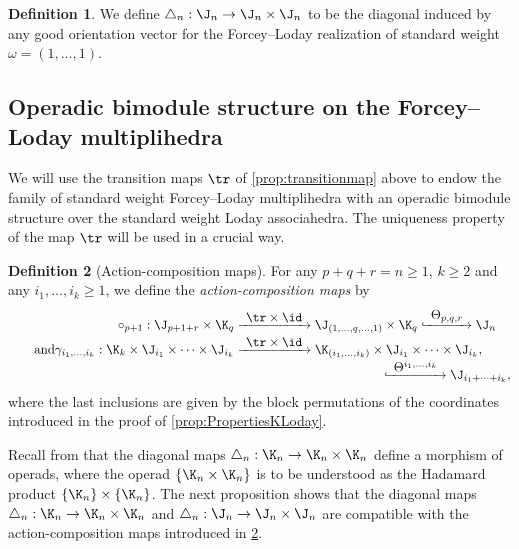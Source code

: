 \documentclass[JEP,XML,SOM,NoFloatCountersInSection,Unicode,published]{cedram}
\def\To#1{\mathchoice{\xrightarrow{\textstyle\kern4pt#1\kern3pt}}{\stackrel{#1}{\longrightarrow}}{}{}}
\def\Hto#1{\mathrel{\lhook\joinrel\To{#1}}}
\theoremstyle{definition}
\newtheorem{definition}{Definition}[section]
\theoremstyle{plain}
\begin{document}
\begin{definition} \label{def:diagonal-multipl-forcey-loday}
We define $\triangle_n : \J_n \to \J_n\times \J_n$ to be the diagonal induced by any good orientation vector for the Forcey--Loday realization of standard weight $\omega=(1, \ldots, 1)$.
\end{definition}

\subsection{Operadic bimodule structure on the Forcey--Loday multiplihedra}

We will use the transition maps $\tr$ of \cref{prop:transitionmap} above to endow the family of standard weight Forcey--Loday multiplihedra with an operadic bimodule structure over the standard weight Loday associahedra.
The uniqueness property of the map $\tr$ will be used in a crucial way.

\begin{definition}[Action-composition maps] \label{def:action-composition}
For any $p+q+r=n\geq 1$, $k\geq 2$ and any $i_1,\ldots,i_k \geq 1$, we define the \emph{action-composition maps} by\vspace*{-3pt}
\begin{align*}
\circ_{p+1}: \J_{p+1+r}\times \K_q
&\To{\tr\times \id}\J_{(1,\ldots,q,\ldots,1)}\times \K_q
\Hto{\Theta_{p,q,r}}\J_{n}\\[-2pt]
\tag*{and}
\gamma_{i_1,\ldots,i_k}: \K_{k}\times \J_{i_1} \times \cdots \times \J_{i_k}
&\To{\tr\times \id}\K_{(i_1,\ldots,i_k)} \times \J_{i_1} \times \cdots \times \J_{i_k},\\[-3pt]
&\hspace*{4cm}\Hto{\Theta^{i_1, \ldots, i_k}}\J_{i_1+\cdots + i_k},
\end{align*}
where the last inclusions are given by the block permutations of the coordinates introduced in the proof of \cref{prop:PropertiesKLoday}.
\end{definition}

Recall from \cite[Th.\,1]{MTTV19} that the diagonal maps $\triangle_n : \K_n \to \K_n \times \K_n$ define a morphism of operads, where the operad $\{ \K_n \times \K_n \}$ is to be understood as the Hadamard product $\{ \K_n \} \times \{ \K_n \}$.
The next proposition shows that the diagonal maps $\triangle_n : \K_n \to \K_n \times \K_n$ and $\triangle_n : \J_n \to \J_n \times \J_n$ are compatible with the action-composition maps introduced in \cref{def:action-composition}.
\end{document}

